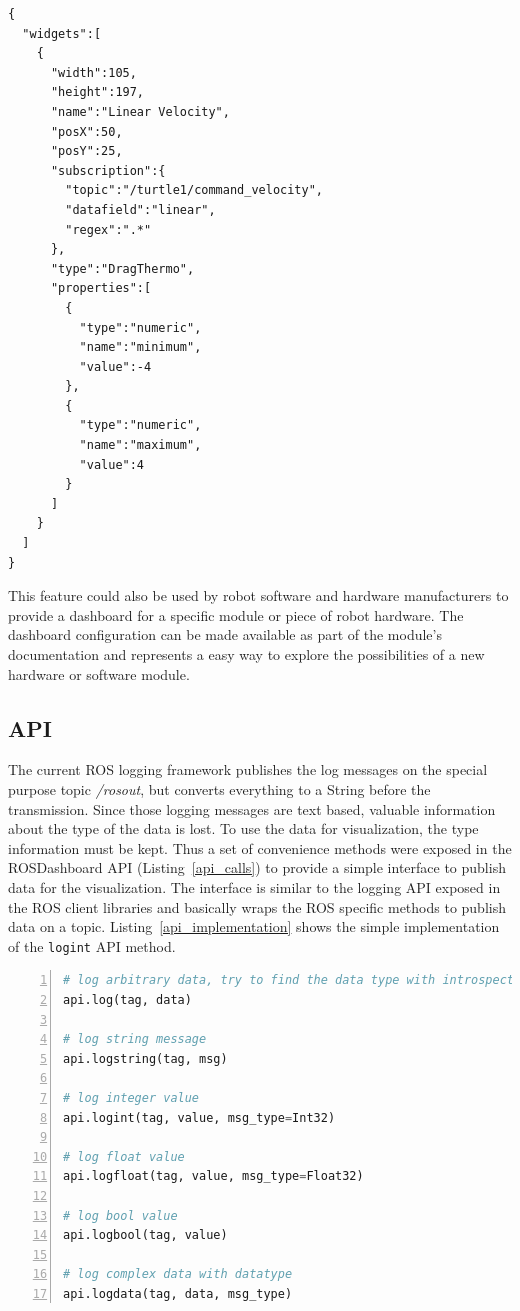 \begin{lstlisting}[float,frame=single,caption={Example dashboard configuration in JSON.},label=json_example]
{
  "widgets":[
    {
      "width":105,
      "height":197,
      "name":"Linear Velocity",
      "posX":50,
      "posY":25,
      "subscription":{
        "topic":"/turtle1/command_velocity",
        "datafield":"linear",
        "regex":".*"
      },
      "type":"DragThermo",
      "properties":[
        {
          "type":"numeric",
          "name":"minimum",
          "value":-4
        },
        {
          "type":"numeric",
          "name":"maximum",
          "value":4
        }
      ]
    }
  ]
}
\end{lstlisting}

This feature could also be used by robot software and hardware manufacturers to provide a dashboard for a specific module or piece of robot hardware. The dashboard configuration can be made available as part of the module's documentation and represents a easy way to explore the possibilities of a new hardware or software module.


\subsection{API}
\label{api_section}
The current ROS logging framework publishes the log messages on the special purpose topic \emph{/rosout}, but converts everything to a String before the transmission. Since those logging messages are text based, valuable information about the type of the data is lost. To use the data for visualization, the type information must be kept. Thus a set of convenience methods were exposed in the ROSDashboard API (Listing~\ref{api_calls}) to provide a simple interface to publish data for the visualization. The interface is similar to the logging API exposed in the ROS client libraries and basically wraps the ROS specific methods to publish data on a topic. Listing~\ref{api_implementation} shows the simple implementation of the \verb+logint+ API method.

\begin{lstlisting}[float,frame=single,caption={ROSDashboard API methods.},label=api_calls,language=Python,numbers=left,breaklines=true]
# log arbitrary data, try to find the data type with introspection
api.log(tag, data)

# log string message
api.logstring(tag, msg)

# log integer value
api.logint(tag, value, msg_type=Int32)

# log float value
api.logfloat(tag, value, msg_type=Float32)

# log bool value
api.logbool(tag, value)

# log complex data with datatype
api.logdata(tag, data, msg_type)
\end{lstlisting}

